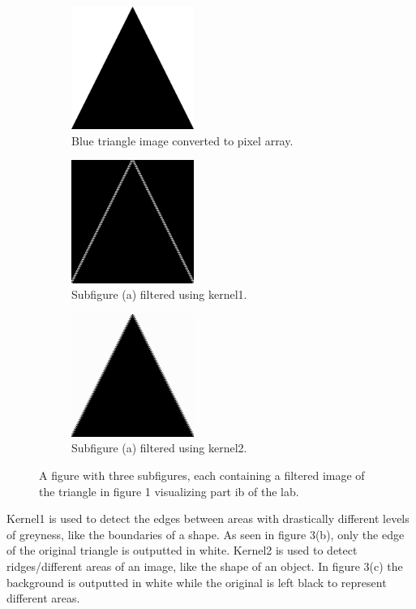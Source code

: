 \documentclass{article}
\begin{document}
\begin{figure}[H]
\centering
\begin{subfigure}{.3\linewidth}
  \centering
  \includegraphics[width=\linewidth, height=4cm]{ib1.png}
  \caption{Blue triangle image converted to pixel array.}
  \label{fig:sub1}
\end{subfigure}%
\begin{subfigure}{.3\textwidth}
  \centering
  \includegraphics[width=\linewidth, height=4cm]{ib2.png}
  \caption{Subfigure (a) filtered using kernel1.}
  \label{fig:sub2}
\end{subfigure}
\label{fig:test}
\begin{subfigure}{.3\linewidth}
  \centering
  \includegraphics[width=\linewidth, height=4cm]{ib3.png}
  \caption{Subfigure (a) filtered using kernel2.}
  \label{fig:sub3}
\end{subfigure}%
\caption{A figure with three subfigures, each containing a filtered image of the triangle in figure 1 visualizing part ib of the lab. }
\label{fig:test}
\end{figure}

Kernel1 is used to detect the edges between areas with drastically different levels of greyness, like the boundaries of a shape. As seen in figure 3(b), only the edge of the original triangle is outputted in white. Kernel2 is used to detect ridges/different areas of an image, like the shape of an object. In figure 3(c) the background is outputted in white while the original is left black to represent different areas.
\end{document}
